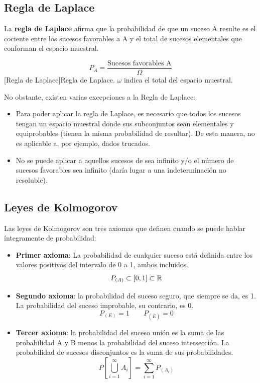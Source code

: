 \subsection{Regla de Laplace}
La \textbf{regla de Laplace} afirma que la probabilidad de que un suceso A resulte es el cociente entre los sucesos favorables a A y el total de sucesos elementales que conforman el espacio muestral.
\begin{center}
    \begin{equation}
        P_A = \dfrac{\mbox{Sucesos favorables A}}{\Omega}
    \end{equation}
    [Regla de Laplace]{Regla de Laplace. $\omega$ indica el total del espacio muestral.}
\end{center}
No obstante, existen varias excepciones a la Regla de Laplace:
\begin{itemize}[itemsep=0pt,parsep=0pt,topsep=0pt,partopsep=0pt]
    \item Para poder aplicar la regla de Laplace, es necesario que todos los sucesos tengan un espacio muestral donde sus subconjuntos sean elementales y equiprobables (tienen la misma probabilidad de resultar). De esta manera, no es aplicable a, por ejemplo, dados trucados.
    \item No se puede aplicar a aquellos sucesos de sea infinito y/o el número de sucesos favorables sea infinito (daría lugar a una indeterminación no resoluble).
\end{itemize}
\subsection{Leyes de Kolmogorov}
Las leyes de Kolmogorov son tres axiomas que definen cuando se puede hablar íntegramente de probabilidad:
\begin{itemize}[itemsep=0pt,parsep=0pt,topsep=0pt,partopsep=0pt]
    \item \textbf{Primer axioma}: La probabilidad de cualquier suceso está definida entre los valores positivos del intervalo de 0 a 1, ambos incluidos.
        \[ P_{\left( A\right) }  \subset \left[ 0,1 \right] \subset \mathbb{R} \]
    \item\textbf{Segundo axioma}: la probabilidad del suceso seguro, que siempre se da, es 1. La probabilidad del suceso improbable, su contrario, es 0.
        \[ P_{\left( E \right) } = 1 \qquad P_{\left( \bar{E} \right) } = 0 \]
    \item\textbf{Tercer axioma}: la probabilidad del suceso unión es la suma de las probabilidad A y B menos la probabilidad del suceso intersección. La probabilidad de sucesos disconjuntos es la suma de sus probabilidades.
        \[ P\left[ \bigcup_{i = 1}^{\infty} A_i\right] = \sum_{i = 1}^{\infty} P_{\left( A_i\right) }  \]
\end{itemize}
